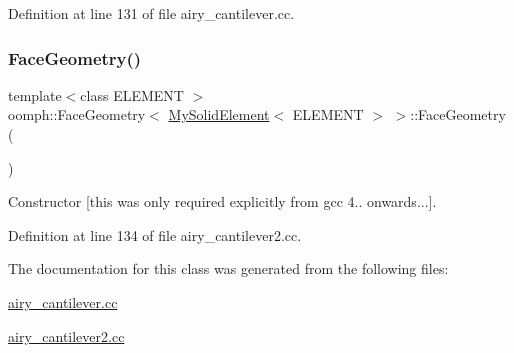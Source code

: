 Definition at line 131 of file airy\+\_\+cantilever.\+cc.

\mbox{\label{classoomph_1_1FaceGeometry_3_01MySolidElement_3_01ELEMENT_01_4_01_4_a4b9e14efef623686f22fb2d3747e16c3}} 
\subsubsection{\texorpdfstring{Face\+Geometry()}{FaceGeometry()}\hspace{0.1cm}{\footnotesize\ttfamily [2/2]}}
{\footnotesize\ttfamily template$<$class E\+L\+E\+M\+E\+NT $>$ \\
oomph\+::\+Face\+Geometry$<$ \hyperlink{classoomph_1_1MySolidElement}{My\+Solid\+Element}$<$ E\+L\+E\+M\+E\+NT $>$ $>$\+::Face\+Geometry (\begin{DoxyParamCaption}{ }\end{DoxyParamCaption})\hspace{0.3cm}{\ttfamily [inline]}}



Constructor \mbox{[}this was only required explicitly from gcc 4.. onwards...\mbox{]}. 



Definition at line 134 of file airy\+\_\+cantilever2.\+cc.



The documentation for this class was generated from the following files\+:\begin{DoxyCompactItemize}
\item 
\hyperlink{airy__cantilever_8cc}{airy\+\_\+cantilever.\+cc}\item 
\hyperlink{airy__cantilever2_8cc}{airy\+\_\+cantilever2.\+cc}\end{DoxyCompactItemize}
